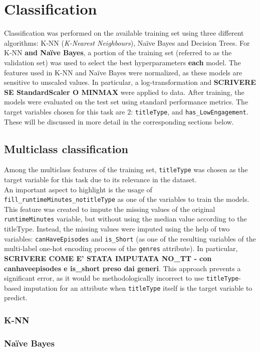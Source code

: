 \chapter{Classification}
\label{ch:capitolo3}
Classification was performed on the available training set using three different algorithms: K-NN (\textit{K-Nearest Neighbours}), Naïve Bayes and Decision Trees.
For K-NN \textbf{and Naïve Bayes}, a portion of the training set (referred to as the validation set) was used to select the best hyperparameters \textbf{each} model.
The features used in K-NN and Naïve Bayes were normalized, as these models are sensitive to unscaled values.
In particular, a log-transformation and \textbf{SCRIVERE SE StandardScaler O MINMAX} were applied to data.
After training, the models were evaluated on the test set using standard performance metrics. 
The target variables chosen for this task are 2: \texttt{titleType}, and \texttt{has\_LowEngagement}.
These will be discussed in more detail in the corresponding sections below.

\section{Multiclass classification}\label{sec:multiclass_classification}
Among the multiclass features of the training set, \texttt{titleType} 
was chosen as the target variable for this task due to its relevance in the dataset.\\
An important aspect to highlight is the usage of \texttt{fill\_runtimeMinutes\_notitleType}
as one of the variables to train the models. 
This feature was created to impute the missing values of the original \texttt{runtimeMinutes} variable,
but without using the median value according to the titleType. Instead, the missing values were imputed using the help of two variables: \texttt{canHaveEpisodes} and \texttt{is\_Short}
(as one of the resulting variables of the multi-label one-hot encoding process of the \texttt{genres} attribute).
In particular, 
\textbf{SCRIVERE COME E' STATA IMPUTATA NO\_TT - con canhaveepisodes e is\_short preso dai generi}.
This approach prevents a significant error, as it would be methodologically incorrect to use \texttt{titleType}-based 
imputation for an attribute when \texttt{titleType} itself is the target variable to predict.
\subsection*{K-NN}
\subsection*{Naïve Bayes}
